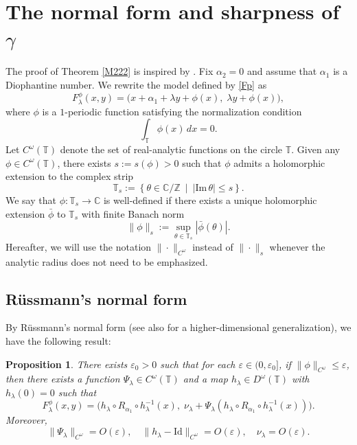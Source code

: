 \documentclass{amsart}
\newcommand{\gm}{\gamma}
\newcommand{\T}{\mathbb{T}}
\newtheorem{Proposition}[Definition]{Proposition}
\theoremstyle{definition}
\begin{document}
\section{\sc The normal form and sharpness of $\gm$}
The proof of Theorem \ref{M222} is inspired by \cite{Ma}.
Fix $\alpha_2 = 0$ and assume that $\alpha_1$ is a Diophantine number. We rewrite the model defined by \eqref{Fp} as
\begin{equation}\label{Fpw}
F^\phi_{\lambda}(x, y) = \big(x + \alpha_1 + \lambda y + \phi(x),\; \lambda y + \phi(x)\big),
\end{equation}
where $\phi$ is a $1$-periodic function satisfying the normalization condition
\[
\int_\T \phi(x)\,dx = 0.
\]
Let $C^\omega(\mathbb{T})$ denote the set of real-analytic functions on the circle $\mathbb{T}$. Given any $\phi \in C^\omega(\mathbb{T})$, there exists $s := s(\phi) > 0$ such that $\phi$ admits a holomorphic extension to the complex strip
\[
\mathbb{T}_s := \left\{ \theta \in \mathbb{C}/\mathbb{Z} \ \middle| \ |\mathrm{Im}\,\theta| \leq s \right\}.
\]
We say that $\phi:\mathbb{T}_s \to \mathbb{C}$ is well-defined if there exists a unique holomorphic extension $\bar{\phi}$ to $\mathbb{T}_s$ with finite Banach norm
\begin{equation}\label{renorm}
\|\phi\|_s := \sup_{\theta \in \mathbb{T}_s} |\bar{\phi}(\theta)|.
\end{equation}
Hereafter, we will use the notation $\|\cdot\|_{C^\omega}$ instead of $\|\cdot\|_s$ whenever the analytic radius does not need to be emphasized.


\subsection{R\"{u}ssmann's normal form}

By R\"{u}ssmann's normal form \cite{R1} (see also \cite[Theorem 5.4]{Mas1} for a higher-dimensional generalization), we have the following result:

\begin{Proposition}\label{prrusss}
There exists $\varepsilon_0 > 0$ such that for each $\varepsilon \in (0, \varepsilon_0]$, if $\|\phi\|_{C^\omega} \leq \varepsilon$, then there exists a function $\Psi_\lambda \in C^\omega(\mathbb{T})$ and a map $h_\lambda \in D^\omega(\mathbb{T})$ with $h_\lambda(0) = 0$ such that
\begin{equation}\label{fhold}
F^\phi_\lambda(x, y) = \big(h_\lambda \circ R_{\alpha_1} \circ h_\lambda^{-1}(x),\; \nu_\lambda + \Psi_\lambda(h_\lambda \circ R_{\alpha_1} \circ h_\lambda^{-1}(x))\big).
\end{equation}
Moreover,
\[
\|\Psi_\lambda\|_{C^\omega} = O(\varepsilon), \quad \|h_\lambda - \mathrm{Id}\|_{C^\omega} = O(\varepsilon), \quad \nu_\lambda = O(\varepsilon).
\]
\end{Proposition}
\end{document}
